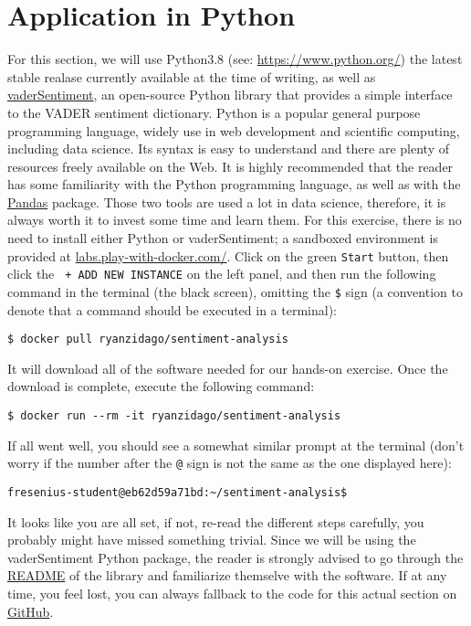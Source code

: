 	\section{Application in Python}\label{sec:applicationsinR}
	For this section, we will use 
	Python3.8 (see: \url{https://www.python.org/})
	the latest stable realase currently available at the time of writing, as well as \href{https://github.com/cjhutto/vaderSentiment}{vaderSentiment}, an open-source Python library that provides a simple interface to the VADER sentiment dictionary. Python is a popular general purpose programming language, widely use in web development and scientific computing, including data science. Its syntax is easy to understand and there are plenty of resources freely available on the Web. It is highly recommended that the reader has some familiarity with the Python programming language, as well as with the \href{https://pandas.pydata.org/}{Pandas} package. Those two tools are used a lot in data science, therefore, it is always worth it to invest some time and learn them. For this exercise, there is no need to install either Python or vaderSentiment; a sandboxed environment is provided at \href{https://labs.play-with-docker.com/#}{labs.play-with-docker.com/}. Click on the green \verb#Start# button, then click the \verb# + ADD NEW INSTANCE# on the left panel, and then run the following command in the terminal (the black screen), omitting the \verb#$# sign (a convention to denote that a command should be executed in a terminal): 
	\begin{Verbatim}
$ docker pull ryanzidago/sentiment-analysis
	\end{Verbatim}
	It will download all of the software needed for our hands-on exercise. Once the download is complete, execute the following command:
	\begin{Verbatim}
$ docker run --rm -it ryanzidago/sentiment-analysis
	\end{Verbatim}
	If all went well, you should see a somewhat similar prompt at the terminal (don't worry if the number after the \verb#@# sign is not the same as the one displayed here):
	\begin{Verbatim}
fresenius-student@eb62d59a71bd:~/sentiment-analysis$
	\end{Verbatim}
	
	It looks like you are all set, if not, re-read the different steps carefully, you probably might have missed something trivial. Since we will be using the vaderSentiment Python package, the reader is strongly advised to go through the \href{https://github.com/cjhutto/vaderSentiment#vader-sentiment-analysis}{README} of the library and familiarize themselve with the software. If at any time, you feel lost, you can always fallback to the code for this actual section on \href{https://gist.github.com/ryanzidago/5440bcd66be55ba23ca9b55cf336bab6}{GitHub}.
	
